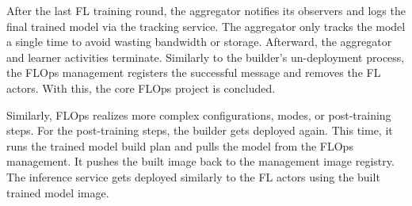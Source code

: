 After the last FL training round, the aggregator notifies its observers and logs the final trained model via the tracking service.
The aggregator only tracks the model a single time to avoid wasting bandwidth or storage.
Afterward, the aggregator and learner activities terminate.
Similarly to the builder's un-deployment process, the FLOps management registers the successful message and removes the FL actors.
With this, the core FLOps project is concluded.

Similarly, FLOps realizes more complex configurations, modes, or post-training steps.
For the post-training steps, the builder gets deployed again.
This time, it runs the trained model build plan and pulls the model from the FLOps management.
It pushes the built image back to the management image registry.
The inference service gets deployed similarly to the FL actors using the built trained model image.

